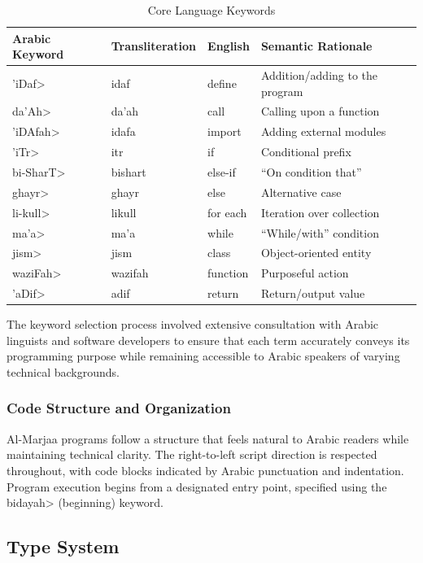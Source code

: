 \documentclass[11pt,a4paper]{article}
\begin{document}
\begin{table}[h]
\centering
\caption{Core Language Keywords}
\label{tab:keywords}
\begin{tabular}{@{}lllp{5cm}@{}}
\toprule
\textbf{Arabic Keyword} & \textbf{Transliteration} & \textbf{English} & \textbf{Semantic Rationale} \\
\midrule
\<'iDaf> & idaf & define & Addition/adding to the program \\
\<da'Ah> & da'ah & call & Calling upon a function \\
\<'iDAfah> & idafa & import & Adding external modules \\
\<'iTr> & itr & if & Conditional prefix \\
\<bi-SharT> & bishart & else-if & ``On condition that'' \\
\<ghayr> & ghayr & else & Alternative case \\
\<li-kull> & likull & for each & Iteration over collection \\
\<ma'a> & ma'a & while & ``While/with'' condition \\
\<jism> & jism & class & Object-oriented entity \\
\<waziFah> & wazifah & function & Purposeful action \\
\<'aDif> & adif & return & Return/output value \\
\bottomrule
\end{tabular}
\end{table}

The keyword selection process involved extensive consultation with Arabic linguists and software developers to ensure that each term accurately conveys its programming purpose while remaining accessible to Arabic speakers of varying technical backgrounds.

\subsubsection{Code Structure and Organization}

Al-Marjaa programs follow a structure that feels natural to Arabic readers while maintaining technical clarity. The right-to-left script direction is respected throughout, with code blocks indicated by Arabic punctuation and indentation. Program execution begins from a designated entry point, specified using the \<bidayah> (beginning) keyword.

\subsection{Type System}
\end{document}
